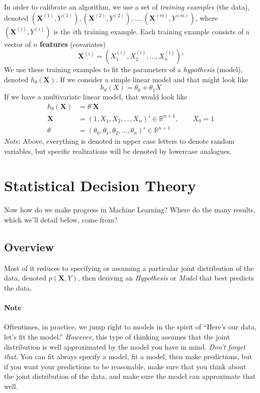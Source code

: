 \documentclass[12pt]{article}
\begin{document}
In order to calibrate an algorithm, we use a set of 
\emph{training examples} (the data), denoted 
$(\mathbf{X}^{(1)}, Y^{(1)}), 
(\mathbf{X}^{(2)}, Y^{(2)}), \ldots, (\mathbf{X}^{(m)}, Y^{(m)})$, 
where $(\mathbf{X}^{(i)}, Y^{(i)})$ is the $i$th training example. Each 
training example consists of a vector of $n$ \textbf{features} 
(covariates)
   \[ \mathbf{X}^{(i)} = \left(X_1^{(i)},X_2^{(i)},\ldots, 
      X_n^{(i)}\right)'\]
We use these training examples to fit the parameters of
a \emph{hypothesis} (model), denoted $h_\theta(\mathbf{X})$. If we
consider a simple linear model and that might look like 
   \[ h_\theta(X) = \theta_0 + \theta_1 X\]
If we have a multivariate linear model, that would look like
\begin{align*}
   h_\theta(\mathbf{X}) &= \theta' \mathbf{X}\\
   \mathbf{X} &= \left(1, X_1, X_2, \ldots, X_n\right)' \in \mathbb{R}^{n+1}, 
      \qquad X_0 = 1\\
   \theta &= \left(\theta_0, \theta_1, \theta_2, \ldots, \theta_n\right)'
   \in \mathbb{R}^{n+1}
\end{align*}
{\sl Note}: Above, everything is denoted in upper case letters 
to denote random variables, but specific realizations will be 
denoted by lowercase analogues.


\section{Statistical Decision Theory}

Now how do we make progress in Machine Learning? Where do
the many results, which we'll detail below, come from?

\subsection{Overview}

Most of it reduces to specifying or assuming a particular
joint distribution of the data, denoted $p(\mathbf{X}, Y)$, 
then deriving an \emph{Hypothesis} or \emph{Model} that 
best predicts the data.

\paragraph{Note} Oftentimes, in practice, we
jump right to models in the spirit of ``Here's our data,
let's fit the model.'' \emph{However}, this type of thinking
assumes that the joint distribution is well approximated
by the model you have in mind. \emph{Don't forget that.}
You can fit always specify a model, fit a model, then 
make predictions, but if you want your predictions to be
reasonable, make sure that you think about the joint
distribution of the data, and make sure the model can 
approximate that well.
\end{document}
